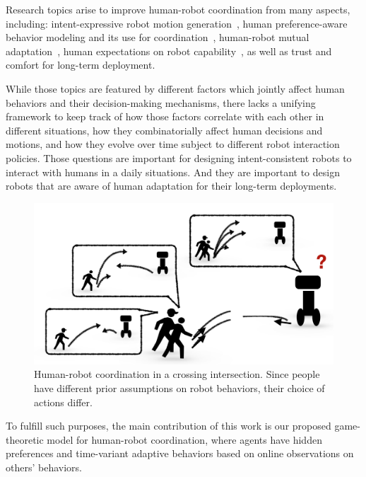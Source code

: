 \documentclass[letterpaper, 10 pt, conference]{ieeeconf}  %
\begin{document}
Research topics arise 
to improve human-robot coordination from many aspects, including: intent-expressive robot 
motion generation~\cite{dragan2013legibility,lichtenthaler2012influence}, human 
preference-aware behavior modeling and its 
use for coordination~\cite{gombolay2015coordination,dorsa2017active}, human-robot mutual 
adaptation~\cite{nikolaidis2013human,nikolaidis2016formalizing}, human 
expectations on robot capability~\cite{cha2015perceived,kwon2016human}, as well as trust and comfort for long-term 
deployment\cite{yang2017evaluating}. 

While those topics are featured by different factors which jointly affect human behaviors and 
their decision-making mechanisms, 
there lacks a unifying framework to keep track of how those factors correlate with 
each other in different situations, how they combinatorially affect human 
decisions and motions, and 
how they evolve over time subject to different robot interaction policies. 
Those questions are important for designing intent-consistent robots to 
interact with humans in a daily situations. And they are important to design 
robots that are aware of human 
adaptation for their long-term deployments.  

   \begin{figure}[t]\label{fig:intro}
      \centering
      \vspace{-1em}
      \includegraphics[scale=0.32]{intro}
      \vspace{-1.5em}
      \caption{Human-robot coordination in a crossing intersection. Since 
      people have different prior assumptions on robot behaviors, their choice 
      of actions differ.}
      \vspace{-1.5em}
   \end{figure}
To fulfill such purposes, the main contribution of this work is our proposed game-theoretic 
model for human-robot coordination, 
where agents have hidden preferences and time-variant adaptive behaviors based 
on online observations on others' behaviors.
\end{document}

